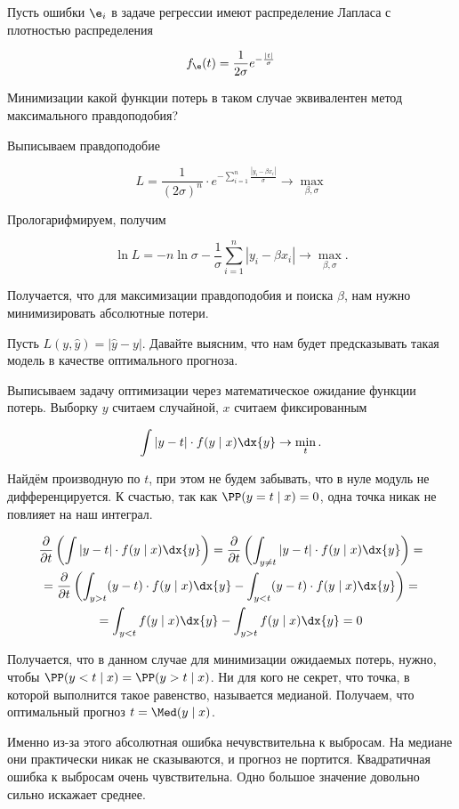 \documentclass[12pt, a4paper, oneside]{article}
\begin{document}
\begin{problem}{}
Пусть ошибки $\e_i$ в задаче регрессии имеют распределение Лапласа с плотностью распределения

\[f_{\e}(t) = \frac{1}{2 \sigma} e^{-\frac{|t|}{\sigma}} \]

Минимизации какой функции потерь в таком случае эквивалентен метод максимального правдоподобия?
\end{problem} 

\begin{sol} 
Выписываем правдоподобие

\[ L = \frac{1}{(2 \sigma)^n} \cdot e^{- \sum_{i=1}^n \frac{|y_i - \beta x_i|}{\sigma}} \to \max_{\beta, \sigma} \]

Прологарифмируем, получим

\[ \ln L = - n \ln \sigma - \frac{1}{\sigma} \sum_{i=1}^n |y_i - \beta x_i| \to \max_{\beta, \sigma}.\]

Получается, что для максимизации правдоподобия и поиска $\beta$, нам нужно минимизировать абсолютные потери.
\end{sol} 

\begin{problem}{}
Пусть $L(y,  \hat y) = |\hat y - y|$. Давайте выясним, что нам будет предсказывать такая модель в качестве оптимального прогноза.
\end{problem} 

\begin{sol} 
Выписываем задачу оптимизации через математическое ожидание функции потерь. Выборку $y$ считаем случайной, $x$ считаем фиксированным

\[ \int |y - t| \cdot f(y \mid x) \dx{y} \to \min_{t}. \]

Найдём производную по $t$, при этом не будем забывать, что в нуле модуль не дифференцируется. К счастью, так как $\PP(y = t \mid x) = 0$, одна точка никак не повлияет на наш интеграл.

\begin{multline*}
\frac{\partial }{\partial t} \left(  \int |y - t| \cdot f(y \mid x) \dx{y}   \right) = \frac{\partial }{\partial t} \left(  \int_{y \neq t} |y - t| \cdot f(y \mid x) \dx{y}   \right) = \\ = \frac{\partial }{\partial t} \left( \int_{y > t} (y - t) \cdot f(y \mid x) \dx{y} - \int_{y < t} (y- t) \cdot f( y \mid x) \dx{y}  \right) = \\
= \int_{y< t} f(y\mid x) \dx{y} - \int_{y > t} f( y \mid x) \dx{y} = 0
\end{multline*}

Получается, что в данном случае для минимизации ожидаемых потерь, нужно, чтобы $\PP(y < t \mid x) = \PP(y > t \mid x)$. Ни для кого не секрет, что точка, в которой выполнится такое равенство, называется медианой. Получаем, что оптимальный прогноз $t = \Med(y \mid x)$.

Именно из-за этого абсолютная ошибка нечувствительна к выбросам. На медиане они практически никак не сказываются, и прогноз не портится. Квадратичная ошибка к выбросам очень чувствительна. Одно большое значение довольно сильно искажает среднее.
\end{sol} 
\end{document}
